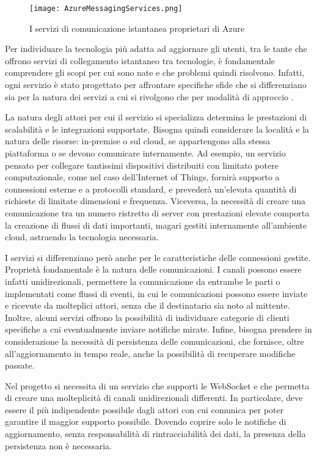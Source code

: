 \begin{figure}[h!]
    \centering
    \texttt{[image: AzureMessagingServices.png]}
    \caption{I servizi di comunicazione istantanea proprietari di Azure}
\end{figure}	


Per individuare la tecnologia più adatta ad aggiornare gli utenti, tra le tante che offrono servizi di collegamento istantaneo tra tecnologie, è fondamentale comprendere  gli scopi per cui sono nate e che problemi quindi risolvono. Infatti, ogni servizio è stato progettato per affrontare specifiche sfide che si differenziano sia per la natura dei servizi a cui si rivolgono che per  modalità di approccio .

La natura degli attori per cui il servizio si specializza determina le prestazioni di scalabilità e le integrazioni supportate. Bisogna quindi considerare la località e la natura delle risorse: in-premise o sul cloud, se appartengono alla stessa piattaforma o se devono comunicare internamente.
Ad esempio, un servizio pensato per collegare tantissimi dispositivi distribuiti con limitato potere computazionale, come nel caso dell’Internet of Things, fornirà  supporto a connessioni esterne e a protocolli standard, e prevederà un’elevata quantità di richieste di limitate dimensioni e frequenza. Viceversa, la necessità di creare una comunicazione tra un numero ristretto di server con prestazioni elevate comporta la creazione di flussi di dati importanti, magari gestiti internamente all’ambiente cloud, astraendo la tecnologia necessaria.

I servizi si differenziano però anche per le caratteristiche delle connessioni gestite.
Proprietà fondamentale è la natura delle comunicazioni. I canali possono essere infatti unidirezionali, permettere la comunicazione da entrambe le parti o implementati come flussi di eventi, in cui le comunicazioni possono essere inviate e ricevute da molteplici attori, senza che il destinatario sia noto al mittente. Inoltre, alcuni servizi offrono la possibilità di individuare categorie di clienti specifiche a cui eventualmente inviare notifiche mirate. Infine, bisogna prendere in considerazione la necessità di persistenza delle comunicazioni, che fornisce, oltre all’aggiornamento in tempo reale, anche la possibilità di recuperare modifiche passate.

Nel progetto si necessita di un servizio che supporti le WebSocket e che permetta di creare una molteplicità di canali unidirezionali differenti. In particolare, deve essere il più indipendente possibile dagli attori con cui comunica per poter garantire il maggior supporto possibile. Dovendo coprire solo le notifiche di aggiornamento, senza responsabilità di rintracciabilità dei dati, la presenza della persistenza non è necessaria.

